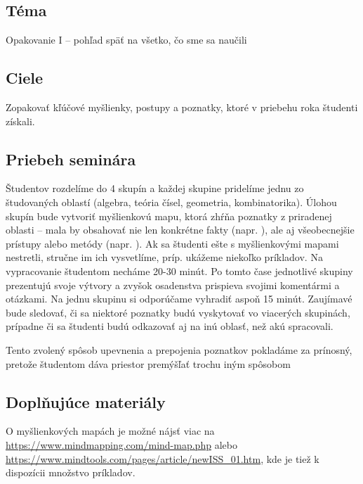 
\subsection*{Téma}
Opakovanie I -- pohľad späť na všetko, čo sme sa naučili

\subsection*{Ciele}

Zopakovať kľúčové myšlienky, postupy a poznatky, ktoré v priebehu roka študenti získali.

\subsection*{Priebeh seminára}


Študentov rozdelíme do 4 skupín a každej skupine pridelíme jednu zo študovaných oblastí (algebra, teória čísel, geometria, kombinatorika). Úlohou skupín bude vytvoriť myšlienkovú mapu, ktorá zhŕňa poznatky z priradenej oblasti -- mala by obsahovať nie len konkrétne fakty (napr. ), ale aj všeobecnejšie prístupy alebo metódy (napr. ).  Ak sa študenti ešte s myšlienkovými mapami nestretli, stručne im ich vysvetlíme, príp. ukážeme niekoľko príkladov. Na vypracovanie študentom necháme 20-30 minút. Po tomto čase jednotlivé skupiny prezentujú svoje výtvory a zvyšok osadenstva prispieva svojimi komentármi a otázkami. Na jednu skupinu si odporúčame vyhradiť aspoň 15 minút. Zaujímavé bude sledovať, či sa niektoré poznatky budú vyskytovať vo viacerých skupinách, prípadne či sa študenti budú odkazovať aj na inú oblasť, než akú spracovali.

Tento zvolený spôsob upevnenia a prepojenia poznatkov pokladáme za prínosný, pretože študentom dáva priestor premýšľať trochu iným spôsobom 


\subsection*{Doplňujúce materiály}

O myšlienkových mapách je možné nájsť viac na \url{https://www.mindmapping.com/mind-map.php} alebo \url{https://www.mindtools.com/pages/article/newISS_01.htm}, kde je tiež k dispozícii množstvo príkladov. 


